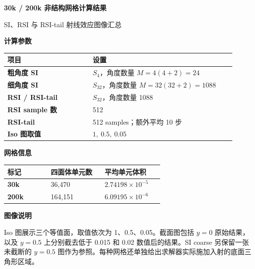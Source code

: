 \documentclass[11pt,a4paper,landscape,fontset=fandol]{ctexart}
\begin{document}
\thispagestyle{empty}
\vspace*{7mm}
{\color{accent}\Huge\bfseries 30k / 200k 非结构网格计算结果}\par
\vspace{3mm}
{\Large SI、RSI 与 RSI-tail 射线效应图像汇总}\par
\vspace{8mm}

\begin{minipage}[t]{0.48\textwidth}
  {\large\bfseries 计算参数}\par\vspace{2mm}
  \begin{tabular}{>{\bfseries}p{0.34\linewidth}p{0.58\linewidth}}
    \toprule
    项目 & 设置 \\
    \midrule
    粗角度 SI & $S_4$，角度数量 $M=4(4+2)=24$ \\
    细角度 SI & $S_{32}$，角度数量 $M=32(32+2)=1088$ \\
    RSI / RSI-tail & $S_{32}$，角度数量 1088 \\
    RSI sample 数 & 512 \\
    RSI-tail & 512 samples；额外平均 10 步 \\
    Iso 图取值 & $1,\ 0.5,\ 0.05$ \\
    \bottomrule
  \end{tabular}
\end{minipage}\hfill
\begin{minipage}[t]{0.48\textwidth}
  {\large\bfseries 网格信息}\par\vspace{2mm}
  \begin{tabular}{>{\bfseries}p{0.25\linewidth}p{0.31\linewidth}p{0.34\linewidth}}
    \toprule
    标记 & 四面体单元数 & 平均单元体积 \\
    \midrule
    30k & 36,470 & $2.74198\times10^{-5}$ \\
    200k & 164,151 & $6.09195\times10^{-6}$ \\
    \bottomrule
  \end{tabular}
  \vspace{7mm}

  {\large\bfseries 图像说明}\par\vspace{2mm}
  Iso 图展示三个等值面，取值依次为 1、0.5、0.05。截面图包括 $y=0$ 原始结果，以及 $y=0.5$ 上分别截去低于 0.015 和 0.02 数值后的结果。SI coarse 另保留一张未截断的 $y=0.5$ 图作为参照。每种网格还单独给出求解器实际施加入射的底面三角形区域。
\end{minipage}
\end{document}
